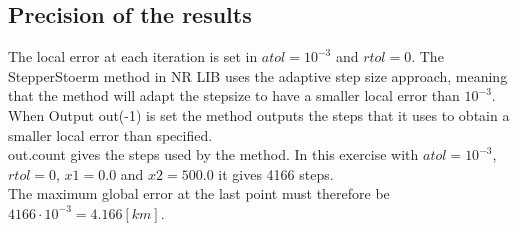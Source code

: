 \subsection{Precision of the results}
The local error at each iteration is set in $atol = 10^{-3}$ and $rtol = 0$. The StepperStoerm method in NR LIB uses the adaptive step size approach, meaning that the method will adapt the stepsize to have a smaller local error than $10^{-3}$.
When Output out(-1) is set the method outputs the steps that it uses to obtain a smaller local error than specified. \\
out.count gives the steps used by the method. In this exercise with $atol = 10^{-3}$, $rtol = 0$, $x1=0.0$ and $x2=500.0$ it gives 4166 steps.\\
The maximum global error at the last point must therefore be \\
$4166 \cdot 10^{-3} = 4.166  [km]$.
